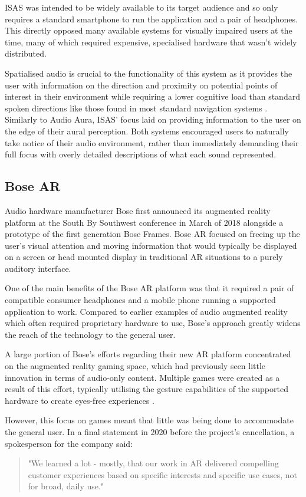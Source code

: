 \documentclass{l4proj}
\begin{document}
ISAS was intended to be widely available to its target audience and so only requires a standard smartphone to run the application and a pair of headphones. This directly opposed many available systems for visually impaired users at the time, many of which required expensive, specialised hardware that wasn't widely distributed.

Spatialised audio is crucial to the functionality of this system as it provides the user with information on the direction and proximity on potential points of interest in their environment while requiring a lower cognitive load than standard spoken directions like those found in most standard navigation systems \citep{klatzky_cognitive_2006}. Similarly to Audio Aura, ISAS' focus laid on providing information to the user on the edge of their aural perception. Both systems encouraged users to naturally take notice of their audio environment, rather than immediately demanding their full focus with overly detailed descriptions of what each sound represented.

\subsection{Bose AR}
Audio hardware manufacturer Bose first announced its augmented reality platform at the South By Southwest conference in March of 2018 \citep{corporation_bose_2018} alongside a prototype of the first generation Bose Frames. Bose AR focused on freeing up the user's visual attention and moving information that would typically be displayed on a screen or head mounted display in traditional AR situations to a purely auditory interface.

One of the main benefits of the Bose AR platform was that it required a pair of compatible consumer headphones and a mobile phone running a supported application to work. Compared to earlier examples of audio augmented reality which often required proprietary hardware to use, Bose's approach greatly widens the reach of the technology to the general user.

A large portion of Bose's efforts regarding their new AR platform concentrated on the augmented reality gaming space, which had previously seen little innovation in terms of audio-only content. Multiple games were created as a result of this effort, typically utilising the gesture capabilities of the supported hardware to create eyes-free experiences \citep{takahashi_bose_2019}. 

However, this focus on games meant that little was being done to accommodate the general user. In a final statement in 2020 before the project's cancellation, a spokesperson for the company said:
\begin{quote}
    "We learned a lot - mostly, that our work in AR delivered compelling customer experiences based on specific interests and specific use cases, not for broad, daily use."
\end{quote} \citep{roettgers_another_2020}
\end{document}
